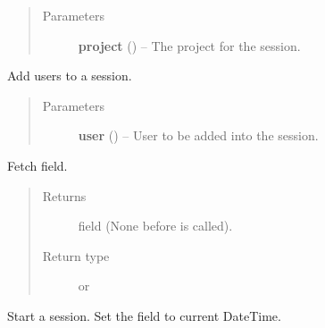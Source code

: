 \documentclass[letterpaper,10pt,english]{sphinxmanual}
\begin{document}
\begin{fulllineitems}
\begin{description}
\begin{itemize}
\end{itemize}

\end{description}
\begin{quote}\begin{description}
\item[{Parameters}] \leavevmode
\textbf{project} ({\hyperref[models:models.Project]{}}) -- The project for the session.

\end{description}\end{quote}

\begin{fulllineitems}
\label{models:models.Session.AddUser}
Add users to a session.
\begin{quote}\begin{description}
\item[{Parameters}] \leavevmode
\textbf{user} ({\hyperref[models:models.User]{}}) -- User to be added into the session.

\end{description}\end{quote}

\end{fulllineitems}


\begin{fulllineitems}
\label{models:models.Session.GetLastChecked}
Fetch  field.
\begin{quote}\begin{description}
\item[{Returns}] \leavevmode
{} field (None before                   is called).

\item[{Return type}] \leavevmode
{} or 

\end{description}\end{quote}

\end{fulllineitems}


\begin{fulllineitems}
\label{models:models.Session.Start}
Start a session.
Set the  field to current DateTime.

\end{fulllineitems}


\end{fulllineitems}
\end{document}
